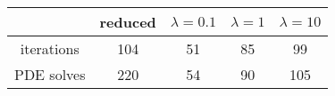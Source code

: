 \begin{tabular}{ccccc}
& reduced & $\lambda = 0.1$ & $\lambda = 1$ & $\lambda = 10$ \\
\hline
iterations & 104 & 51 & 85 & 99 \\
PDE solves & 220 & 54 & 90 & 105 \\
\hline
\end{tabular}
